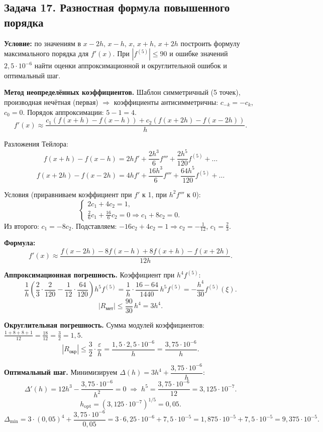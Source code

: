 \documentclass{article}
\begin{document}
\subsection*{Задача 17. Разностная формула повышенного порядка}
\textbf{Условие:} по значениям в $x-2h,\, x-h,\, x,\, x+h,\, x+2h$ построить формулу максимального порядка для $f'(x)$. При $|f^{(5)}|\le 90$ и ошибке значений $2{,}5\cdot 10^{-6}$ найти оценки аппроксимационной и округлительной ошибок и оптимальный шаг.

\textbf{Метод неопределённых коэффициентов.} Шаблон симметричный (5 точек), производная нечётная (первая) $\Rightarrow$ коэффициенты антисимметричны: $c_{-k} = -c_k$, $c_0 = 0$. Порядок аппроксимации: $5 - 1 = 4$.
$$f'(x) \approx \frac{c_1(f(x+h)-f(x-h)) + c_2(f(x+2h)-f(x-2h))}{h}.$$

Разложения Тейлора:
$$f(x+h)-f(x-h) = 2hf' + \frac{2h^3}{6}f''' + \frac{2h^5}{120}f^{(5)} + \dots$$
$$f(x+2h)-f(x-2h) = 4hf' + \frac{16h^3}{6}f''' + \frac{64h^5}{120}f^{(5)} + \dots$$

Условия (приравниваем коэффициент при $f'$ к 1, при $h^2 f'''$ к 0):
$$\begin{cases} 2c_1 + 4c_2 = 1, \\ \frac{2}{6}c_1 + \frac{16}{6}c_2 = 0 \Rightarrow c_1 + 8c_2 = 0. \end{cases}$$
Из второго: $c_1 = -8c_2$. Подставляем: $-16c_2 + 4c_2 = 1 \Rightarrow c_2 = -\tfrac{1}{12}$, $c_1 = \tfrac{2}{3}$.

\textbf{Формула:}
$$\boxed{f'(x) \approx \frac{f(x-2h) - 8f(x-h) + 8f(x+h) - f(x+2h)}{12h}.}$$

\textbf{Аппроксимационная погрешность.} Коэффициент при $h^4 f^{(5)}$:
$$\frac{1}{h}\left(\frac{2}{3}\cdot\frac{2}{120} - \frac{1}{12}\cdot\frac{64}{120}\right)h^5 f^{(5)} = \frac{1}{h}\cdot\frac{16-64}{1440}\,h^5 f^{(5)} = -\frac{h^4}{30}f^{(5)}(\xi).$$
$$|R_{\text{мет}}| \le \frac{90}{30}\,h^4 = 3h^4.$$

\textbf{Округлительная погрешность.} Сумма модулей коэффициентов: $\frac{1+8+8+1}{12} = \frac{18}{12} = \frac{3}{2} = 1{,}5$.
$$|R_{\text{окр}}| \le \frac{3}{2}\cdot\frac{\varepsilon}{h} = \frac{1{,}5\cdot 2{,}5\cdot 10^{-6}}{h} = \frac{3{,}75\cdot 10^{-6}}{h}.$$

\textbf{Оптимальный шаг.} Минимизируем $\Delta(h) = 3h^4 + \dfrac{3{,}75\cdot 10^{-6}}{h}$:
$$\Delta'(h) = 12h^3 - \frac{3{,}75\cdot 10^{-6}}{h^2} = 0 \;\Rightarrow\; h^5 = \frac{3{,}75\cdot 10^{-6}}{12} = 3{,}125\cdot 10^{-7}.$$
$$\boxed{h_{\text{opt}} = (3{,}125\cdot 10^{-7})^{1/5} = 0{,}05.}$$
$$\Delta_{\min} = 3\cdot(0{,}05)^4 + \frac{3{,}75\cdot 10^{-6}}{0{,}05} = 3\cdot 6{,}25\cdot 10^{-6} + 7{,}5\cdot 10^{-5} = 1{,}875\cdot 10^{-5} + 7{,}5\cdot 10^{-5} = 9{,}375\cdot 10^{-5}.$$
\end{document}
